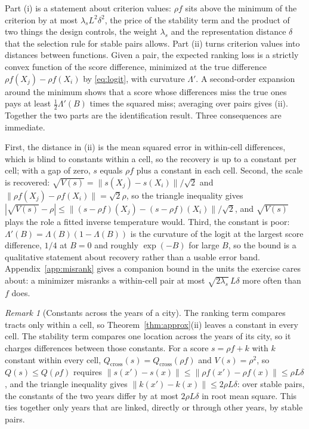 \documentclass[11pt]{article}
\theoremstyle{remark}
\newtheorem{remark}{Remark}
\newcommand{\Qc}{Q_{\mathrm{cross}}}
\newcommand{\Qt}{Q}
\begin{document}
Part (i) is a statement about criterion values: $\rho f$ sits above the minimum of the criterion by at
most $\lambda_{s}L^{2}\delta^{2}$, the price of the stability term and the product of two things the
design controls, the weight $\lambda_{s}$ and the representation distance $\delta$ that the selection
rule for stable pairs allows. Part (ii) turns criterion values into distances between functions. Given
a pair, the expected ranking loss is a strictly convex function of the score difference, minimized at
the true difference $\rho f(X_j)-\rho f(X_i)$ by \eqref{eq:logit}, with curvature $\Lambda'$. A
second-order expansion around the minimum shows that a score whose differences miss the true ones pays
at least $\tfrac12\Lambda'(B)$ times the squared miss; averaging over pairs gives (ii). Together the two
parts are the identification result. Three consequences are immediate.

First, the distance in (ii) is the mean squared error in within-cell differences, which is blind to
constants within a cell, so the recovery is up to a constant per cell; with a gap of zero, $s$ equals
$\rho f$ plus a constant in each cell. Second, the scale is recovered: $\sqrt{V(s)} =
\|s(X_j)-s(X_i)\|/\sqrt2$ and $\|\rho f(X_j)-\rho f(X_i)\| = \sqrt2\rho$, so the triangle inequality
gives $|\sqrt{V(s)}-\rho| \le \|(s-\rho f)(X_j)-(s-\rho f)(X_i)\|/\sqrt2$, and $\sqrt{V(s)}$ plays the
role a fitted inverse temperature would. Third, the constant is poor: $\Lambda'(B) =
\Lambda(B)(1-\Lambda(B))$ is the curvature of the logit at the largest score difference, $1/4$ at $B=0$
and roughly $\exp(-B)$ for large $B$, so the bound is a qualitative statement about recovery rather
than a usable error band. Appendix~\ref{app:misrank} gives a companion bound in the units the exercise
cares about: a minimizer misranks a within-cell pair at most $\sqrt{2\lambda_{s}}\,L\delta$ more often
than $f$ does.

\begin{remark}[Constants across the years of a city]\label{rem:kappa}
The ranking term compares tracts only within a cell, so Theorem~\ref{thm:approx}(ii) leaves a constant
in every cell. The stability term compares one location across the years of its city, so it charges
differences between those constants. For a score $s = \rho f + k$ with $k$ constant within every cell,
$\Qc(s) = \Qc(\rho f)$ and $V(s) = \rho^{2}$, so $\Qt(s) \le \Qt(\rho f)$ requires
$\|s(x')-s(x)\| \le \|\rho f(x')-\rho f(x)\| \le \rho L\delta$, and the triangle inequality gives
$\|k(x')-k(x)\| \le 2\rho L\delta$: over stable pairs, the constants of the two years differ by at most
$2\rho L\delta$ in root mean square. This ties together only years that are linked, directly or through
other years, by stable pairs.
\end{remark}
\end{document}
